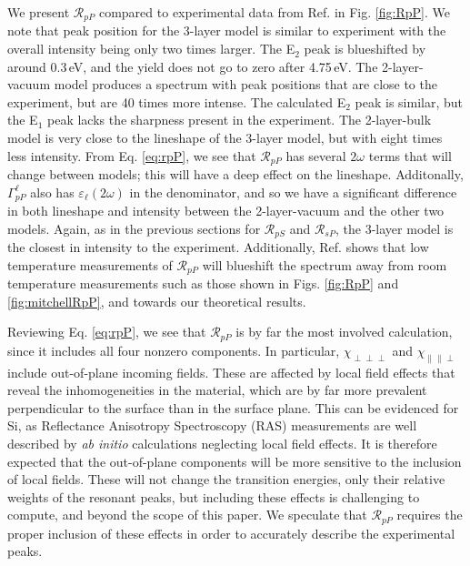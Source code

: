 \documentclass[11pt]{book}
\begin{document}
We present $\mathcal{R}_{pP}$ compared to experimental data from Ref.
\cite{mejiaPRB02} in Fig. \ref{fig:RpP}. We note that peak position for
the 3-layer model is similar to experiment with the overall intensity being only
two times larger. The E$_{2}$ peak is blueshifted by around 0.3\,eV, and the
yield does not go to zero after 4.75\,eV. The 2-layer-vacuum model produces a
spectrum with peak positions that are close to the experiment, but are 40 times
more intense. The calculated E$_{2}$ peak is similar, but the E$_{1}$ peak lacks
the sharpness present in the experiment. The 2-layer-bulk model is very close to
the lineshape of the 3-layer model, but with eight times less intensity. From
Eq. \eqref{eq:rpP}, we see that $\mathcal{R}_{pP}$ has several $2\omega$ terms
that will change between models; this will have a deep effect on the lineshape.
Additonally, $\Gamma^{\ell}_{pP}$ also has $\varepsilon_{\ell}(2\omega)$ in the
denominator, and so we have a significant difference in both lineshape and
intensity between the 2-layer-vacuum and the other two models. Again, as in the
previous sections for $\mathcal{R}_{pS}$ and $\mathcal{R}_{sP}$, the 3-layer
model is the closest in intensity to the experiment. Additionally, Ref.
\cite{dadapPRB97} shows that low temperature measurements of
$\mathcal{R}_{pP}$ will blueshift the spectrum away from room temperature
measurements such as those shown in Figs. \ref{fig:RpP} and
\ref{fig:mitchellRpP}, and towards our theoretical results.

Reviewing Eq. \eqref{eq:rpP}, we see that $\mathcal{R}_{pP}$ is by far the most
involved calculation, since it includes all four nonzero components. In
particular, $\chi_{\perp\perp\perp}$ and $\chi_{\parallel\parallel\perp}$
include out-of-plane incoming fields. These are affected by local field
effects\cite{tancognedejean:tel-01235611} that reveal the inhomogeneities in the
material, which are by far more prevalent perpendicular to the surface than in
the surface plane. This can be evidenced for Si, as Reflectance Anisotropy
Spectroscopy (RAS) measurements are well described by \emph{ab initio}
calculations neglecting local field effects.\cite{palummoPRB99, gaalPRB09} It is
therefore expected that the out-of-plane components will be more sensitive to
the inclusion of local fields. These will not change the transition energies,
only their relative weights of the resonant
peaks,\cite{tancognedejean:tel-01235611} but including these effects is
challenging to compute,\cite{nicolasPRB15} and beyond the scope of this paper.
We speculate that $\mathcal{R}_{pP}$ requires the proper inclusion of these
effects in order to accurately describe the experimental peaks.
\end{document}
